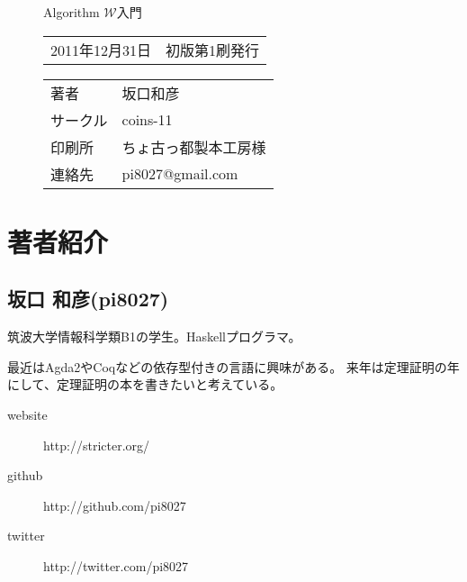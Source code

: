 
\begin{figure}[b]

{\LARGE Algorithm $\mathcal W$入門}

\hrulefill

\begin{tabular}{rl}
2011年12月31日 & 初版第1刷発行
\end{tabular}

\vspace{1zh}

\begin{tabular}{ll}
著者     & 坂口和彦 \\
サークル & coins-11 \\
印刷所   & ちょ古っ都製本工房様 \\
連絡先   & pi8027@gmail.com \\
\end{tabular}

\hrulefill

\vspace{2zh}

\end{figure}

\section*{著者紹介}

\subsection*{坂口 和彦(pi8027)}

筑波大学情報科学類B1の学生。Haskellプログラマ。

最近はAgda2やCoqなどの依存型付きの言語に興味がある。
来年は定理証明の年にして、定理証明の本を書きたいと考えている。

\begin{description}
\item[website] http://stricter.org/
\item[github] http://github.com/pi8027
\item[twitter] http://twitter.com/pi8027
\end{description}


